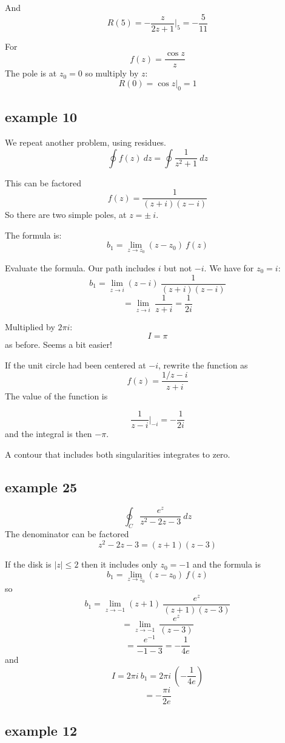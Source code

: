 \documentclass[11pt, oneside]{article}
\begin{document}
And
\[ R(5) = -\frac{z}{2z + 1} \bigg |_5 = - \frac{5}{11} \]

For
\[ f(z) = \frac{\cos z}{z} \]
The pole is at $z_0 = 0$ so multiply by $z$:
\[ R(0) = \cos z \bigg |_0 = 1 \]

\subsection*{example 10}

\label{sec:ex10R}

We repeat another problem, using residues.  
\[ \oint f(z) \ dz = \oint \frac{1}{z^2 + 1} \ dz \]

This can be factored
\[ f(z) = \frac{1}{(z + i)(z - i)} \]
So there are two simple poles, at $z = \pm \ i$.

The formula is:
\[ b_1 = \lim_{z \rightarrow z_0} (z-z_0) \ f(z)  \]

Evaluate the formula.  Our path includes $i$ but not $-i$.  We have for $z_0 = i$:
\[ b_1 = \lim_{z \rightarrow i} (z-i) \  \frac{1}{(z+i)(z-i)} \]
\[ = \lim_{z \rightarrow i}  \  \frac{1}{z+i} = \frac{1}{2i} \]

Multiplied by $2 \pi i$:
\[ I = \pi \]
as before.  Seems a bit easier!

If the unit circle had been centered at $-i$, rewrite the function as
\[ f(z) = \frac{1/z-i}{z+i} \]
The value of the function is

\[ \frac{1}{z-i} \bigg |_{-i} = -\frac{1}{2i} \]
and the integral is then $- \pi$.

A contour that includes both singularities integrates to zero.

\subsection*{example 25}

\label{sec:ex25R}

\[ \oint_C \frac{e^z}{z^2 - 2z - 3} \ dz \]
The denominator can be factored
\[ z^2 - 2z - 3 = (z + 1)(z - 3) \]

If the disk is $|z| \le 2$ then it includes only $z_0 = -1$ and the formula is
\[ b_1 = \lim_{z \rightarrow z_0} (z-z_0) \ f(z)  \]
so
\[ b_1 = \lim_{z \rightarrow -1} (z+1) \ \frac{e^z}{(z + 1)(z - 3)}  \]
\[ = \lim_{z \rightarrow -1} \ \frac{e^z}{(z - 3)}  \]
\[ = \frac{e^{-1}}{-1 - 3} = - \frac{1}{4 e} \]
and
\[ I = 2 \pi i \ b_1 = 2 \pi i \ (- \frac{1}{4 e}) \]
\[ = - \frac{\pi i}{2 e} \]

\subsection*{example 12}
\end{document}
